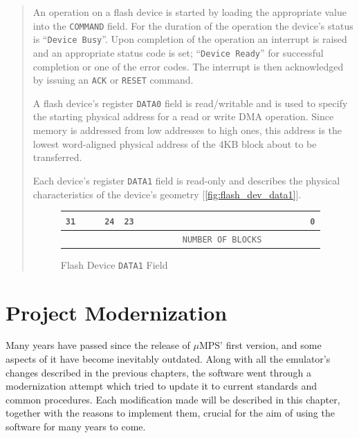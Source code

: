 \documentclass[12pt,a4paper,openright,twoside]{report}
\begin{document}
\begin{quote}
	An operation on a flash device is started by loading the appropriate value into the \texttt{COMMAND} field. For the duration of the operation the device's status is ``\texttt{Device Busy}''.
	Upon completion of the operation an interrupt is raised and an appropriate status code is set; ``\texttt{Device Ready}'' for successful completion or one
	of the error codes.
	The interrupt is then acknowledged by issuing an \texttt{ACK} or \texttt{RESET} command.

	A flash device’s register \texttt{DATA0} field is read/writable and is used to specify the starting physical address for a read or write DMA operation.
	Since memory is addressed from low addresses to high ones, this address is the lowest word-aligned physical address of the 4KB block about to be transferred.

	Each device's register \texttt{DATA1} field is read-only and describes the physical characteristics of the device's geometry [\autoref{fig:flash_dev_data1}].
	\begin{figure}[h]
		\centering
		\begin{tabularx}{\textwidth}{XXXXXXXXXXXXXXXX}
			\texttt{31}                           &                  &                  & \multicolumn{1}{r}{\texttt{24}}       & \texttt{23} &  &  &  &  &                                               &  &  &  &  &                       & \multicolumn{1}{r}{\texttt{0}} \\ \hline
			\multicolumn{1}{|l}{\cellcolor{gray}} & \cellcolor{gray} & \cellcolor{gray} & \multicolumn{1}{l|}{\cellcolor{gray}} &             &  &  &  &  & \multicolumn{2}{l}{\texttt{NUMBER OF BLOCKS}} &  &  &  &  & \multicolumn{1}{l|}{}                                  \\ \hline
		\end{tabularx}
		\caption{Flash Device \texttt{DATA1} Field}
		\label{fig:flash_dev_data1}
	\end{figure}
\end{quote}

\chapter{Project Modernization}
\lhead[\fancyplain{}{\bfseries\thepage}]{\fancyplain{}{\bfseries\rightmark}}
Many years have passed since the release of $\mu$MPS' first version, and some aspects of it have become inevitably outdated.
Along with all the emulator's changes described in the previous chapters, the software went through a modernization attempt which tried to update it to current standards and common procedures.
Each modification made will be described in this chapter, together with the reasons to implement them, crucial for the aim of using the software for many years to come.
\end{document}
